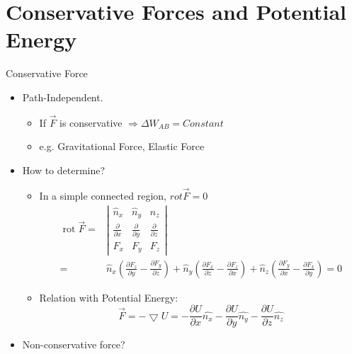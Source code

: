 \documentclass{beamer}
\begin{document}
\section{Conservative Forces and Potential Energy}
\begin{frame}{Conservative Force}
  \begin{itemize}
    \item Path-Independent.
    \begin{itemize}
      \item If $\vec{F}$ is conservative $\Rightarrow \Delta W_{AB} = Constant$
      \item e.g. Gravitational Force, Elastic Force 
    \end{itemize}
    \item How to determine?
    \begin{itemize}
      \item In a simple connected region, $rot\vec{F} = 0$ $$\begin{aligned}
        \operatorname{rot} \vec{F}=&\left|\begin{array}{ccc}
        \hat{n}_{x} & \hat{n}_{y} & \hat{n}_{z} \\
        \frac{\partial}{\partial x} & \frac{\partial}{\partial y} & \frac{\partial}{\partial z} \\
        F_{x} & F_{y} & F_{z}
        \end{array}\right|\\=&  \hat{n}_{x}\left(\frac{\partial F_{z}}{\partial y}-\frac{\partial F_{y}}{\partial z}\right)+\hat{n}_{y}\left(\frac{\partial F_{x}}{\partial z}-\frac{\partial F_{z}}{\partial x}\right)+\hat{n}_{z}\left(\frac{\partial F_{y}}{\partial x}-\frac{\partial F_{x}}{\partial y}\right)=0
        \end{aligned}$$
        \item Relation with Potential Energy:$$\vec{F}=-\bigtriangledown U=-\frac{\partial U}{\partial x}\hat{n_x}-\frac{\partial U}{\partial y}\hat{n_y}-\frac{\partial U}{\partial z}\hat{n_z}$$
    \end{itemize}
    \item Non-conservative force?
  \end{itemize}
\end{frame}
\end{document}
